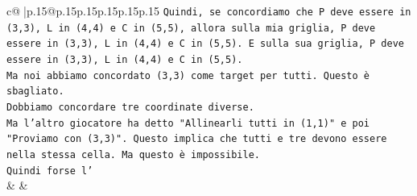 \documentclass{article}
\begin{document}
{\begin{supertabular}{c@{$\;$}|p{.15\linewidth}@{}p{.15\linewidth}p{.15\linewidth}p{.15\linewidth}p{.15\linewidth}p{.15\linewidth}}
{{{\texttt{Quindi, se concordiamo che P deve essere in (3,3), L in (4,4) e C in (5,5), allora sulla mia griglia, P deve essere in (3,3), L in (4,4) e C in (5,5). E sulla sua griglia, P deve essere in (3,3), L in (4,4) e C in (5,5).} \\
\texttt{Ma noi abbiamo concordato (3,3) come target per tutti. Questo è sbagliato.} \\
\texttt{Dobbiamo concordare tre coordinate diverse.} \\
\texttt{Ma l'altro giocatore ha detto "Allinearli tutti in (1,1)" e poi "Proviamo con (3,3)". Questo implica che tutti e tre devono essere nella stessa cella. Ma questo è impossibile.} \\
\texttt{Quindi forse l'} \\
            }
        }
    }
    & & \\ \\


\end{supertabular}}
\end{document}
